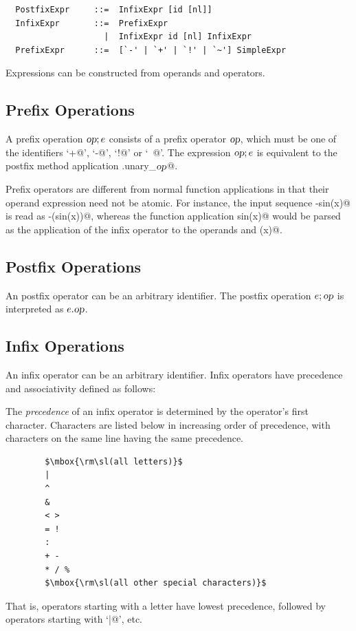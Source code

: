 \syntax\begin{lstlisting}
  PostfixExpr     ::=  InfixExpr [id [nl]]
  InfixExpr       ::=  PrefixExpr
                    |  InfixExpr id [nl] InfixExpr
  PrefixExpr      ::=  [`-' | `+' | `!' | `~'] SimpleExpr 
\end{lstlisting}

Expressions can be constructed from operands and operators. 

\subsection{Prefix Operations}

A prefix operation $\mbox{\sl op};e$ consists of a prefix operator $\mbox{\sl op}$, which
must be one of the identifiers `\lstinline@+@', `\lstinline@-@',
`\lstinline@!@' or `\lstinline@~@'. The expression $\mbox{\sl op};e$ is
equivalent to the postfix method application
\lstinline@e.unary_$\mbox{\sl op}$@.


Prefix operators are different from normal function applications in
that their operand expression need not be atomic. For instance, the
input sequence \lstinline@-sin(x)@ is read as \lstinline@-(sin(x))@, whereas the
function application \lstinline@negate sin(x)@ would be parsed as the
application of the infix operator  to the operands
 and \lstinline@(x)@.

\subsection{Postfix Operations}

An postfix operator can be an arbitrary identifier. The postfix
operation $e;\mbox{\sl op}$ is interpreted as $e.\mbox{\sl op}$. 

\subsection{Infix Operations}

An infix operator can be an arbitrary identifier. Infix operators have
precedence and associativity defined as follows:

The {\em precedence} of an infix operator is determined by the operator's first
character. Characters are listed below in increasing order of
precedence, with characters on the same line having the same precedence.
\begin{lstlisting}
        $\mbox{\rm\sl(all letters)}$
        |
        ^
        &
        < >
        = !
        :
        + -
        * / %
        $\mbox{\rm\sl(all other special characters)}$
\end{lstlisting}
That is, operators starting with a letter have lowest precedence,
followed by operators starting with `\lstinline@|@', etc.

